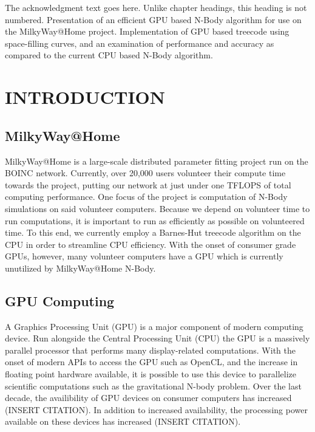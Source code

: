\documentclass{thesis}
\author{Clayton Rayment}
\begin{document}
 
\titlepage             %
\tableofcontents       %
\listoftables          %
\listoffigures         %

The acknowledgment text goes here. Unlike chapter headings, 
this heading is not numbered.
Presentation of an efficient GPU based N-Body algorithm for use on the MilkyWay@Home project. Implementation of GPU based treecode using space-filling curves, and an examination of performance and accuracy as compared to the current CPU based N-Body algorithm.
\chapter{INTRODUCTION}
\section{MilkyWay@Home}
MilkyWay@Home is a large-scale distributed parameter fitting project run on the BOINC network. Currently, over 20,000 users volunteer their compute time towards the project, putting our network at just under one TFLOPS of total computing performance.  One focus of the project is computation of N-Body simulations on said volunteer computers. Because we depend on volunteer time to run computations, it is important to run as efficiently as possible on volunteered time. To this end, we currently employ a Barnes-Hut treecode algorithm on the CPU in order to streamline CPU efficiency. With the onset of consumer grade GPUs, however, many volunteer computers have a GPU which is currently unutilized by MilkyWay@Home N-Body.
\section{GPU Computing}
A Graphics Processing Unit (GPU) is a major component of modern computing device. Run alongside the Central Processing Unit (CPU) the GPU is a massively parallel processor that performs many display-related computations. With the onset of modern APIs to access the GPU such as OpenCL, and the increase in floating point hardware available, it is possible to use this device to parallelize scientific computations such as the gravitational N-body problem. Over the last decade, the availibility of GPU devices on consumer computers has increased (INSERT CITATION). In addition to increased availability, the processing power available on these devices has increased (INSERT CITATION).
\end{document}
